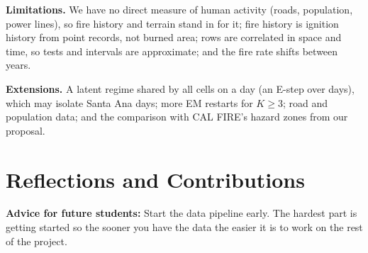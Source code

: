 \documentclass[11pt]{article}
\begin{document}
\textbf{Limitations.} We have no direct measure of human activity (roads, population, power
lines), so fire history and terrain stand in for it; fire history is ignition history from point
records, not burned area; rows are correlated in space and time, so tests and intervals are
approximate; and the fire rate shifts between years.

\textbf{Extensions.} A latent regime shared by all cells on a day (an E-step over days), which may
isolate Santa Ana days; more EM restarts for $K\ge3$; road and population data; and the comparison
with CAL FIRE's hazard zones from our proposal.

\section{Reflections and Contributions}

\textbf{Advice for future students: } Start the data pipeline early. The hardest part is getting started so the sooner you have the data the easier it is to work on the rest of the project.
\end{document}
